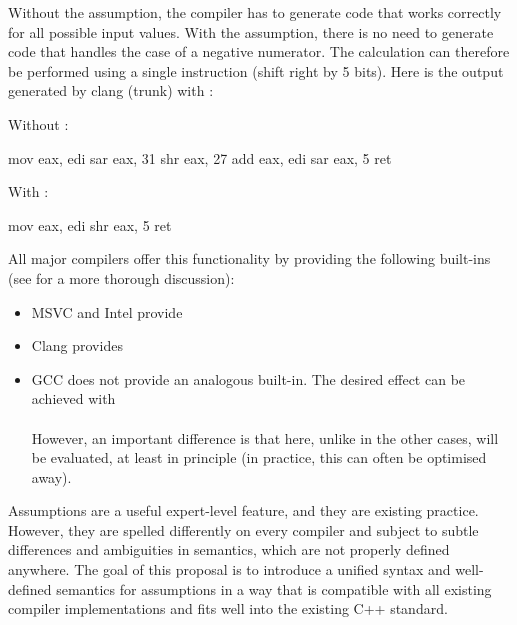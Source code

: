 Without the assumption, the compiler has to generate code that works correctly for all possible input values. With the assumption, there is no need to generate code that handles the case of a negative numerator. The calculation can therefore be performed using a single instruction (shift right by 5 bits). Here is the output generated by clang (trunk) with :

\begin{multicols}{2}
Without :

\begin{codeblock}
  mov eax, edi
  sar eax, 31
  shr eax, 27
  add eax, edi
  sar eax, 5
  ret
\end{codeblock}

\columnbreak

With :

\begin{codeblock}
  mov eax, edi
  shr eax, 5
  ret
\end{codeblock}

\end{multicols}

All major compilers offer this functionality by providing the following built-ins (see \cite{N4425} for a more thorough discussion):
\begin{itemize}
\item MSVC and Intel provide 
\item Clang provides 
\item GCC does not provide an analogous built-in. The desired effect can be achieved with \\
  \\
However, an important difference is that here, unlike in the other cases,  will be evaluated, at least in principle (in practice, this can often be optimised away).
\end{itemize}

Assumptions are a useful expert-level feature, and they are existing practice. However, they are spelled differently on every compiler and subject to subtle differences and ambiguities in semantics, which are not properly defined anywhere. The goal of this proposal is to introduce a unified syntax and well-defined semantics for assumptions in a way that is compatible with all existing compiler implementations and fits well into the existing C++ standard.

